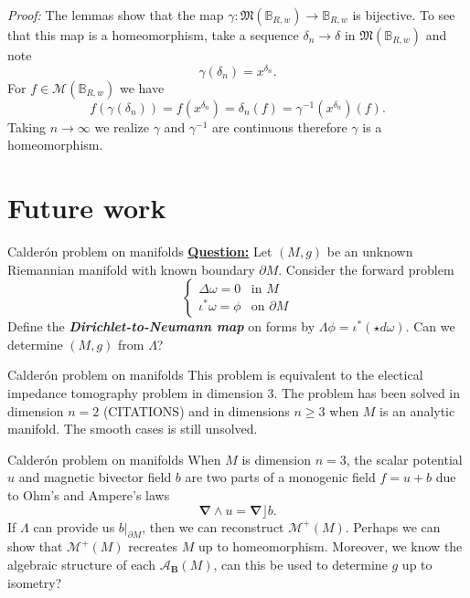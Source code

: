 \documentclass[aspectratio=169,handout]{beamer}
\newcommand\boldgreen[1]{\textcolor{lighter_csu_green}{\emph{\textbf{#1}}}}
\newcommand{\algebra}{\mathcal{A}}
\newcommand{\grad}{\boldsymbol{\nabla}}
\newcommand{\characters}{\mathfrak{M}}
\newcommand{\monogenics}{\mathcal{M}}
\newcommand{\ball}{\mathbb{B}}
\newcommand{\blade}[1]{\boldsymbol{#1}}
\newcommand{\boundary}{{\partial M}}
\newcommand{\monogenicfields}[1]{\mathcal{M}^{#1}(M)}
\newcommand{\bivector}{\blade{B}}
\begin{document}
\begin{frame}{}
\vfill
\emph{Proof:} The lemmas show that the map $\gamma \colon \characters(\ball_{R,w}) \to \ball_{R,w}$ is bijective. To see that this map is a homeomorphism, take a sequence $\delta_n \to \delta$ in $\characters(\ball_{R,w})$ and note
\[
\gamma(\delta_n)=x^{\delta_n}.
\]
For $f\in \monogenics(\ball_{R,w})$ we have
\[
f(\gamma(\delta_n))=f(x^{\delta_n})=\delta_n(f)=\gamma^{-1}(x^{\delta_n})(f).
\]
Taking $n\to \infty$ we realize $\gamma$ and $\gamma^{-1}$ are continuous therefore $\gamma$ is a homeomorphism.
\vfill
\end{frame}

\section{Future work}

\begin{frame}{Calder\'on problem on manifolds}
\textbf{\underline{Question:}} Let $(M,g)$ be an unknown Riemannian manifold with known boundary $\partial M$. Consider the forward problem
\[
\begin{cases}
\Delta \omega = 0 & \textrm{in $M$}\\
\iota^*\omega = \phi & \textrm{on $\partial M$}
\end{cases}
\]
Define the \boldgreen{Dirichlet-to-Neumann map} on forms by $\Lambda\phi = \iota^*(\star d \omega)$. Can we determine $(M,g)$ from $\Lambda$?
\end{frame}

\begin{frame}{Calder\'on problem on manifolds}
This problem is equivalent to the electical impedance tomography problem in dimension 3. The problem has been solved in dimension $n=2$ (CITATIONS) and in dimensions $n\geq 3$ when $M$ is an analytic manifold. The smooth cases is still unsolved.
\end{frame}

\begin{frame}{Calder\'on problem on manifolds}
When $M$ is dimension $n=3$, the scalar potential $u$ and magnetic bivector field $b$ are two parts of a monogenic field $f=u+b$ due to Ohm's and Ampere's laws 
\[
\grad \wedge u = \grad \rfloor b.
\] 
If $\Lambda$ can provide us $b\vert_\boundary$, then we can reconstruct $\monogenicfields{+}$. Perhaps we can show that $\monogenicfields{+}$ recreates $M$ up to homeomorphism. Moreover, we know the algebraic structure of each $\algebra_{\bivector}(M)$, can this be used to determine $g$ up to isometry?
\end{frame}
\end{document}
